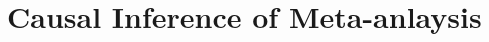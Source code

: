 \documentclass[12pt,openright,oneside,letterpaper,onecolumn]{report}  %
\begin{document}
\part{Causal Inference of Meta-anlaysis}
\label{sec:meta}


% 

% 
% 

% 
%  
\end{document}
